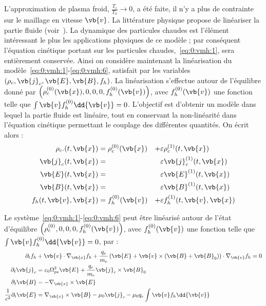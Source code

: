 L'approximation de plasma froid, $\frac{T_c}{T_h}\to 0$, a été faite, il n'y a plus de contrainte sur le maillage en vitesse $\vb{v}$. La littérature physique propose de linéariser la partie fluide (voir~\cite{Holderied:2019}). La dynamique des particules chaudes est l'élément intéressant le plus les applications physiques de ce modèle ; par conséquent l'équation cinétique portant sur les particules chaudes,~\eqref{eq:0:vmh:1}, sera entièrement conservée. Ainsi on considère maintenant la linéarisation du modèle~\eqref{eq:0:vmh:1}-\eqref{eq:0:vmh:6}, satisfait par les variables $(\rho_c,\vb{j}_c,\vb{E},\vb{B},f_h)$. La linéarisation s'effectue autour de l'équilibre donné par $\left(\rho_c^{(0)}(\vb{x}),0,0,0,f_h^{(0)}(\vb{v})\right)$, avec $f_h^{(0)}(\vb{v})$ une fonction telle que $\int\vb{v}f_h^{(0)}\dd{\vb{v}} = 0$. L'objectif est d'obtenir un modèle dans lequel la partie fluide est linéaire, tout en conservant la non-linéarité dans l'équation cinétique permettant le couplage des différentes quantités. On écrit alors :
\begin{equation}
  \begin{aligned}
    \rho_c. (t,\vb{x}) &= \rho_c^{(0)}(\vb{x}) & + & \varepsilon\rho_c^{(1)}(t,\vb{x}) \\
    \vb{j}_c(t,\vb{x}) &=                      &   & \varepsilon\vb{j}_c^{(1)}(t,\vb{x}) \\
    \vb{E}  (t,\vb{x}) &=                      &   & \varepsilon\vb{E}^{(1)}(t,\vb{x}) \\
    \vb{B}  (t,\vb{x}) &=                      &   & \varepsilon\vb{B}^{(1)}(t,\vb{x}) \\
    f_h(t,\vb{v},\vb{x}) &= f_h^{(0)}(\vb{v})  & + & \varepsilon f_h^{(1)}(t,\vb{v},\vb{x})
  \end{aligned}
  \label{eq:0:linear}
\end{equation}

\begin{pro}
  \label{pro:0:vmhl}
  Le système~\eqref{eq:0:vmh:1}-\eqref{eq:0:vmh:6} peut être linéarisé autour de l'état d'équilibre $\left(\rho_c^{(0)},0,0,0,f_h^{(0)}(\vb{v})\right)$, avec $f_h^{(0)}(\vb{v})$ une fonction telle que $\int\vb{v}f_h^{(0)}\dd{\vb{v}} = 0$, par :
  \begin{align}
    \label{eq:0:vmhl:1}
      \partial_t f_h &+ \vb{v}\cdot\nabla_{\vb{x}} f_h + \frac{q_e}{m_e}\left( \vb{E} + \vb{v}\times(\vb{B}+\vb{B}_0) \right)\cdot\nabla_{\vb{v}} f_h = 0 \\
    \label{eq:0:vmhl:2}
      \partial_t\vb{j}_c &= \varepsilon_0\Omega_{pe}^2\vb{E} + \frac{q_e}{m_e}\vb{j}_c\times\vb{B}_0 \\
    \label{eq:0:vmhl:3}
      \partial_t\vb{B} &= -\nabla_{\vb{x}}\times\vb{E} \\
    \label{eq:0:vmhl:4}
      \frac{1}{c^2}\partial_t\vb{E} &= \nabla_{\vb{x}}\times\vb{B} - \mu_0\vb{j}_c - \mu_0q_e\int\vb{v}f_h\dd{\vb{v}}
  \end{align}
\end{pro}

